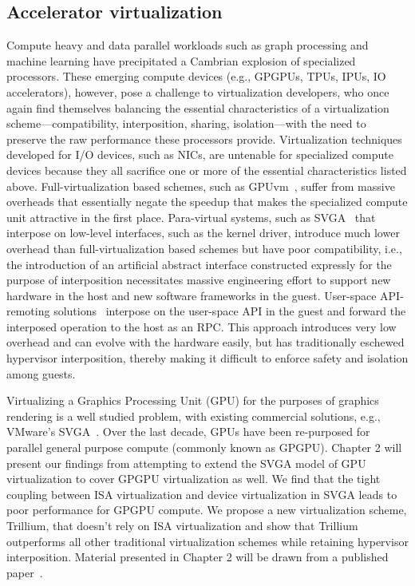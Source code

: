 \subsection{Accelerator virtualization}
Compute heavy and data parallel workloads such as graph processing and machine
learning have precipitated a Cambrian explosion of specialized processors.
These emerging compute devices (e.g., GPGPUs, TPUs, IPUs, IO accelerators),
however, pose a challenge to virtualization developers, who once again find
themselves balancing the essential characteristics of a virtualization
scheme---compatibility, interposition, sharing, isolation---with the need to
preserve the raw performance these processors provide. Virtualization
techniques developed for I/O devices, such as NICs, are untenable for
specialized compute devices because they all sacrifice one or more of the
essential characteristics listed above.
Full-virtualization based schemes, such as GPUvm~\cite{suzuki2014gpuvm},
suffer from massive overheads that essentially negate the speedup that makes
the specialized compute unit attractive in the first place.
Para-virtual systems, such as SVGA~\cite{vmware-virtual-gpu} that interpose on
low-level interfaces, such as the kernel driver, introduce much lower overhead
than full-virtualization based schemes but have poor compatibility, i.e., the
introduction of an artificial abstract interface constructed expressly for the
purpose of interposition necessitates massive engineering effort to support
new hardware in the host and new software frameworks in the guest.
User-space API-remoting solutions~\cite{vmCUDA,rCUDA,rCUDAnew} interpose on
the user-space API in the guest and forward the interposed operation to the
host as an RPC. This approach introduces very low overhead and can evolve with
the hardware easily, but has traditionally eschewed hypervisor interposition,
thereby making it difficult to enforce safety and isolation among guests.

Virtualizing a Graphics Processing Unit (GPU) for the purposes of graphics
rendering is a well studied problem, with existing commercial solutions, e.g.,
VMware’s SVGA~\cite{dowty2009gpu}. Over the last decade, GPUs have been
re-purposed for parallel general purpose compute (commonly known as GPGPU).
Chapter 2 will present our findings from attempting to extend the SVGA model
of GPU virtualization to cover GPGPU virtualization as well. We find that the
tight coupling between ISA virtualization and device virtualization in SVGA
leads to poor performance for GPGPU compute. We propose a new virtualization
scheme, Trillium, that doesn’t rely on ISA virtualization and show that
Trillium outperforms all other traditional virtualization schemes while
retaining hypervisor interposition. Material presented in Chapter 2 will be
drawn from a published paper~\cite{trillium}.

